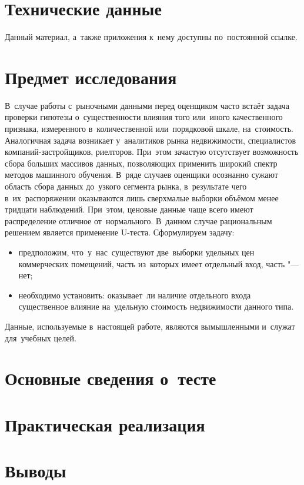 \documentclass[]{scrartcl}
\begin{document}
\section{Технические данные}
Данный материал, а~также приложения к~нему доступны по~постоянной ссылке.

\section{Предмет исследования}
В~случае работы с~рыночными данными перед оценщиком часто встаёт задача проверки гипотезы о~существенности влияния того или~иного качественного признака, измеренного в~количественной или~порядковой шкале, на~стоимость. Аналогичная задача возникает у~аналитиков рынка недвижимости, специалистов компаний-застройщиков, риелторов. При~этом зачастую отсутствует возможность сбора больших массивов данных, позволяющих применить широкий спектр методов машинного обучения. В~ряде случаев оценщики осознанно сужают область сбора данных до~узкого сегмента рынка, в~результате чего в~их~распоряжении оказываются лишь сверхмалые выборки объёмом менее тридцати наблюдений. При~этом, ценовые данные чаще всего имеют распределение отличное от~нормального. В~данном случае рациональным решением является применение U-теста. Сформулируем задачу:
\begin{itemize}
	\item предположим, что~у~нас~существуют две~выборки удельных цен коммерческих помещений, часть из~которых имеет отдельный вход, часть "--- нет;
	\item необходимо установить: оказывает~ли наличие отдельного входа существенное влияние на~удельную стоимость недвижимости данного типа.
\end{itemize}
Данные, используемые в~настоящей работе, являются вымышленными и~служат для~учебных целей. 
 
\section{Основные сведения о~тесте}

\section{Практическая реализация}

\section{Выводы}

\printbibliography[title=Источники информации]
\end{document}
